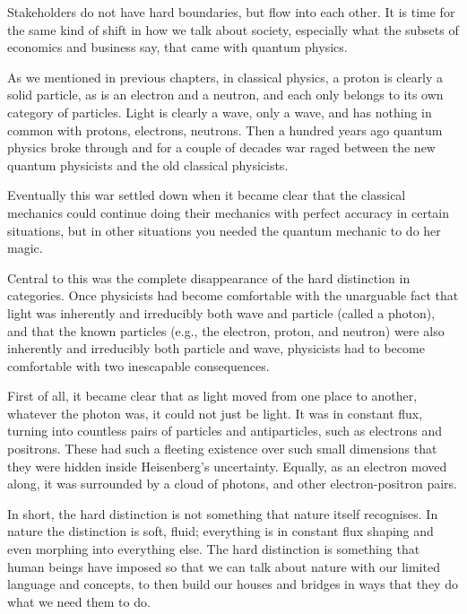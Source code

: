 Stakeholders do not have hard boundaries, but flow into each other. It is time for the same kind of shift in how we talk about society, especially what the subsets of economics and business say, that came with quantum physics. 


As we mentioned in previous chapters, in classical physics, a proton is clearly a solid particle, as is an electron and a neutron, and each only belongs to its own category of particles. Light is clearly a wave, only a wave, and has nothing in common with protons, electrons, neutrons. Then a hundred years ago quantum physics  broke through and for a couple of decades war raged between the new quantum physicists and the old classical physicists. 


Eventually this war settled down when it became clear that the classical mechanics could continue doing their mechanics with perfect accuracy in certain situations, but in other situations you needed the quantum mechanic to do her magic.


Central to this was the complete disappearance of the hard distinction in categories. Once physicists had become comfortable with the unarguable fact that light was inherently and irreducibly both wave and particle (called a photon), and that the known particles (e.g., the electron, proton, and neutron) were also inherently and irreducibly both particle and wave, physicists had to become comfortable with two inescapable consequences.


First of all, it became clear that as light moved from one place to another, whatever the photon was, it could not just be light. It was in constant flux, turning into countless pairs of particles and antiparticles, such as electrons and positrons. These had such a fleeting existence over such small dimensions that they were hidden inside Heisenberg's uncertainty. Equally, as an electron moved along, it was surrounded by a cloud of photons, and other electron-positron pairs.


In short, the hard distinction is not something that nature itself recognises. In nature the distinction is soft, fluid; everything is in constant flux shaping and even morphing into everything else. The hard distinction is something that human beings have imposed so that we can talk about nature with our limited language and concepts, to then build our houses and bridges in ways that they do what we need them to do.


